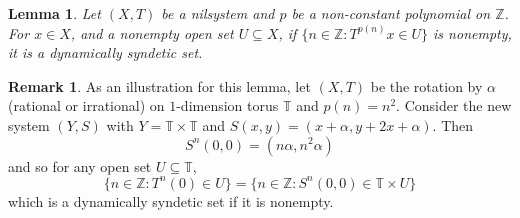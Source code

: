 \documentclass{article}
\theoremstyle{plain}
\newtheorem{lemma}[Theorem]{Lemma}
\theoremstyle{claim}
\theoremstyle{definition}
\newtheorem{remark}[Theorem]{Remark}
\theoremstyle{plain}
\theoremstyle{plain}
\newcommand{\Z}{\mathbb{Z}}
\newcommand{\T}{\mathbb{T}}
\newcommand{\1}{\boldsymbol{1}}
\begin{document}
\begin{lemma}\label{lem:polynomial_in_nil_dynamical_syndetic}
Let $(X, T)$ be a nilsystem and $p$ be a non-constant polynomial on $\Z$. For $x \in X$, and a nonempty open set $U \subseteq X$, if $\{n \in \Z: T^{p(n)} x \in U\}$ is nonempty, it is a dynamically syndetic set.
\end{lemma}
\begin{remark}
As an illustration for this lemma, let $(X, T)$ be the rotation by $\alpha$ (rational or irrational) on $1$-dimension torus $\T$ and $p(n) = n^2$. 
Consider the new system $(Y, S)$ with $Y = \T \times \T$ and $S(x, y) = (x + \alpha, y + 2x + \alpha)$. Then
\[
    S^n(0, 0) = (n \alpha, n^2 \alpha)
\]
and so for any open set $U \subseteq \T$,
\[
     \{n \in \Z: T^n(0) \in U\} = \{n \in \Z: S^n(0, 0) \in \T \times U\}
\]
which is a dynamically syndetic set if it is nonempty.
\end{remark}
\end{document}
